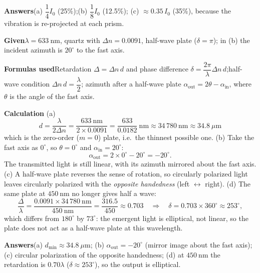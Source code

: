 \documentclass[10.5pt]{ctexart}
\begin{document}
\textbf{Answers}\quad (a) $\dfrac{1}{4}I_0$ (25\%);\qquad (b) $\dfrac{1}{8}I_0$ (12.5\%);\qquad
(c) $\approx0.35\,I_0$ (35\%), because the vibration is re-projected at each prism.


\textbf{Given}\quad $\lambda=633\ \mathrm{nm}$, quartz with $\Delta n=0.0091$, half-wave plate
($\delta=\pi$); in (b) the incident azimuth is $20^{\circ}$ to the fast axis.

\textbf{Formulas used}\quad Retardation $\Delta=\Delta n\,d$ and phase difference
$\delta=\dfrac{2\pi}{\lambda}\Delta n\,d$;\quad half-wave condition $\Delta n\,d=\dfrac{\lambda}{2}$;\quad
azimuth after a half-wave plate $\alpha_{\text{out}}=2\theta-\alpha_{\text{in}}$, where $\theta$ is the angle
of the fast axis.

\textbf{Calculation}\quad
(a)
\begin{equation*}
d=\frac{\lambda}{2\Delta n}=\frac{633\ \mathrm{nm}}{2\times0.0091}
=\frac{633}{0.0182}\ \mathrm{nm}\approx34\,780\ \mathrm{nm}\approx34.8\ \mu\mathrm{m}
\end{equation*}
which is the zero-order ($m=0$) plate, i.e.\ the thinnest possible one.
(b) Take the fast axis as $0^{\circ}$, so $\theta=0^{\circ}$ and $\alpha_{\text{in}}=20^{\circ}$:
\begin{equation*}
\alpha_{\text{out}}=2\times0^{\circ}-20^{\circ}=-20^{\circ}.
\end{equation*}
The transmitted light is still linear, with its azimuth mirrored about the fast axis.
(c) A half-wave plate reverses the sense of rotation, so circularly polarized light leaves circularly polarized
with the \emph{opposite handedness} (left $\leftrightarrow$ right).
(d) The same plate at $450\ \mathrm{nm}$ no longer gives half a wave:
\begin{equation*}
\frac{\Delta}{\lambda}=\frac{0.0091\times34\,780\ \mathrm{nm}}{450\ \mathrm{nm}}
=\frac{316.5}{450}\approx0.703
\quad\Longrightarrow\quad
\delta=0.703\times360^{\circ}\approx253^{\circ},
\end{equation*}
which differs from $180^{\circ}$ by $73^{\circ}$: the emergent light is elliptical, not linear, so the plate
does not act as a half-wave plate at this wavelength.

\textbf{Answers}\quad (a) $d_{\min}\approx34.8\ \mu\mathrm{m}$;\qquad
(b) $\alpha_{\text{out}}=-20^{\circ}$ (mirror image about the fast axis);\qquad
(c) circular polarization of the opposite handedness;\qquad
(d) at $450\ \mathrm{nm}$ the retardation is $0.70\lambda$ ($\delta\approx253^{\circ}$), so the output is elliptical.
\end{document}
